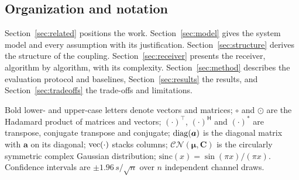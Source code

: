 \subsection{Organization and notation}
Section~\ref{sec:related} positions the work. Section~\ref{sec:model} gives the system
model and every assumption with its justification. Section~\ref{sec:structure} derives
the structure of the coupling. Section~\ref{sec:receiver} presents the receiver,
algorithm by algorithm, with its complexity. Section~\ref{sec:method} describes the
evaluation protocol and baselines, Section~\ref{sec:results} the results, and
Section~\ref{sec:tradeoffs} the trade-offs and limitations.

Bold lower- and upper-case letters denote vectors and matrices; $\circ$ and $\odot$ are
the Hadamard product of matrices and vectors; $(\cdot)^{\top}$, $(\cdot)^{\mathsf H}$ and
$(\cdot)^{*}$ are transpose, conjugate transpose and conjugate; $\operatorname{diag}(\bm a)$ is the
diagonal matrix with $\bm a$ on its diagonal; $\operatorname{vec}(\cdot)$ stacks columns;
$\mathcal{CN}(\bm\mu,\bm C)$ is the circularly symmetric complex Gaussian distribution;
$\mathrm{sinc}(x)=\sin(\pi x)/(\pi x)$. Confidence intervals are $\pm1.96\,s/\sqrt{n}$
over $n$ independent channel draws.
